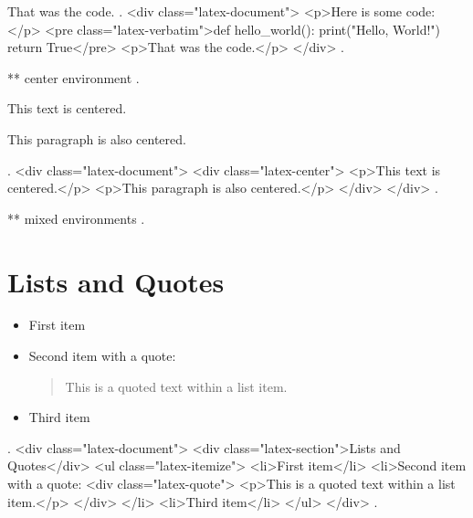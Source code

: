 That was the code.
.
<div class="latex-document">
<p>Here is some code:</p>
<pre class="latex-verbatim">def hello_world():
    print("Hello, World!")
    return True</pre>
<p>That was the code.</p>
</div>
.


** center environment
.
\begin{center}
This text is centered.

This paragraph is also centered.
\end{center}
.
<div class="latex-document">
<div class="latex-center">
<p>This text is centered.</p>
<p>This paragraph is also centered.</p>
</div>
</div>
.


** mixed environments
.
\section{Lists and Quotes}

\begin{itemize}
\item First item
\item Second item with a quote:
\begin{quote}
This is a quoted text within a list item.
\end{quote}
\item Third item
\end{itemize}
.
<div class="latex-document">
<div class="latex-section">Lists and Quotes</div>
<ul class="latex-itemize">
<li>First item</li>
<li>Second item with a quote:
<div class="latex-quote">
<p>This is a quoted text within a list item.</p>
</div>
</li>
<li>Third item</li>
</ul>
</div>
.
